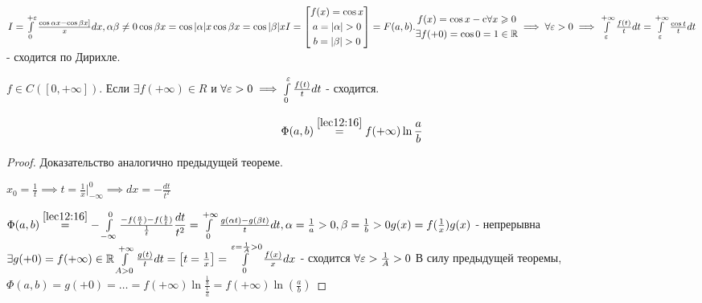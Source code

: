 \documentclass[../../main.tex]{subfiles}
\begin{document}
	\begin{exmp}
		$I = \int\limits_0^{+\varepsilon} \frac{\cos \alpha x - \cos \beta x]}{x} dx, \alpha\beta \neq 0
		\\
		\cos \beta x = \cos |\alpha| x
		\\
		\cos \beta x = \cos |\beta| x
		\\
		I = \left[ \begin{gathered} f(x) = \cos x \\ a = |\alpha| > 0 \\ b = |\beta| > 0 \end{gathered} \right]
		= F(a, b).
		\\ 
		\begin{gathered} f(x) = \cos x  - \textup{c} \forall x \geqslant 0 \\ \exists f(+0) = \cos 0 = 1 \in \mathbb{R} \end{gathered} \implies \forall \varepsilon > 0 \implies \int\limits_{\varepsilon}^{+\infty} \frac{f(t)}{t} dt = \int\limits_{\varepsilon}^{+\infty} \frac{\cos t}{t} dt$ - сходится по Дирихле.
	\end{exmp}

	\begin{thm}
		$f \in C([0, +\infty])$. Если $\exists f(+\infty) \in R$ и  $\forall \varepsilon > 0 \implies \int\limits_0^{\varepsilon} \frac{f(t)}{t} dt$ - сходится.
		
		\begin{equation}
			\label{lab13:20}
			\Phi(a, b) \stk{lec12:16}= f(+\infty) \ln \frac{a}{b}
		\end{equation}
	\end{thm}

	\begin{proof}
		Доказательство аналогично предыдущей теореме.
		
		$x_0 = \frac{1}{t} \implies t = \frac{1}{x}|^0_{-\infty} \implies dx = - \frac{dt}{t^2}$
		
		$\Phi(a, b) \stk{lec12:16} = - \int\limits_{-\infty}^0 \frac{-f(\frac{a}{t})-f(\frac{b}{t})}{\frac{1}{t}} \dfrac{dt}{t^2} = \int\limits_0^{+\infty} \frac{g(\alpha t) - g(\beta t)}{t} dt, 
		\\
		\alpha = \frac{1}{a} > 0, \beta = \frac{1}{b} > 0
		\\
		g(x) = f(\frac{1}{x})
		\\
		g(x)$ - непрерывна
		$
		\exists g(+0) = f(+\infty) \in \mathbb{R}
		\\
		\int\limits_{A > 0}^{+\infty} \frac{g(t)}{t} dt = \left[ t = \frac{1}{x} \right] = \int\limits_0^{\varepsilon = \frac{1}{A} > 0} \frac{f(x)}{x} dx$ - сходится $\forall \varepsilon > \frac{1}{A} > 0 $
		В силу предыдущей теоремы, $\Phi(a, b) = g(+0) = \ldots = f(+\infty) \ln \frac{\frac{1}{b}}{\frac{1}{a}} = f(+\infty) \ln (\frac{a}{b})$
	\end{proof}
\end{document}
